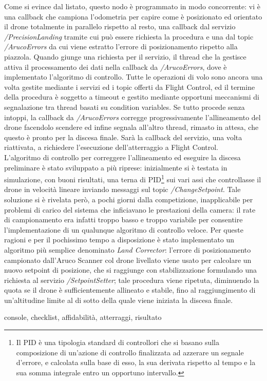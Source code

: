 Come si evince dal listato, questo nodo è programmato in modo concorrente: vi è una callback che campiona l'odometria per capire come è posizionato ed orientato il drone totalmente in parallelo rispetto al resto, una callback dal servizio \emph{/PrecisionLanding} tramite cui può essere richiesta la procedura e una dal topic \emph{/ArucoErrors} da cui viene estratto l'errore di posizionamento rispetto alla piazzola. Quando giunge una richiesta per il servizio, il thread che la gestisce attiva il processamento dei dati nella callback da \emph{/ArucoErrors}, dove è implementato l'algoritmo di controllo. Tutte le operazioni di volo sono ancora una volta gestite mediante i servizi ed i topic offerti da Flight Control, ed il termine della procedura è soggetto a timeout e gestito mediante opportuni meccanismi di segnalazione tra thread basati su condition variables. Se tutto procede senza intoppi, la callback da \emph{/ArucoErrors} corregge progressivamente l'allineamento del drone facendolo scendere ed infine segnala all'altro thread, rimasto in attesa, che questo è pronto per la discesa finale. Sarà la callback del servizio, una volta riattivata, a richiedere l'esecuzione dell'atterraggio a Flight Control.\\
L'algoritmo di controllo per correggere l'allineamento ed eseguire la discesa preliminare è stato sviluppato a più riprese: inizialmente si è testata in simulazione, con buoni risultati, una terna di PID\footnote{Il PID è una tipologia standard di controllori che si basano sulla composizione di un'azione di controllo finalizzata ad azzerare un segnale d'errore, e calcolata sulla base di esso, la sua derivata rispetto al tempo e la sua somma integrale entro un opportuno intervallo.} sui vari assi che controllasse il drone in velocità lineare inviando messaggi sul topic \emph{/ChangeSetpoint}. Tale soluzione si è rivelata però, a pochi giorni dalla competizione, inapplicabile per problemi di carico del sistema che inficiavano le prestazioni della camera: il rate di campionamento era infatti troppo basso e troppo variabile per consentire l'implementazione di un qualunque algoritmo di controllo veloce. Per queste ragioni e per il pochissimo tempo a disposizione è stato implementato un algoritmo più semplice denominato \emph{Land Corrector}: l'errore di posizionamento campionato dall'Aruco Scanner col drone livellato viene usato per calcolare un nuovo setpoint di posizione, che si raggiunge con stabilizzazione formulando una richiesta al servizio \emph{/SetpointSetter}; tale procedura viene ripetuta, diminuendo la quota se il drone è sufficientemente allineato e stabile, fino al raggiungimento di un'altitudine limite al di sotto della quale viene iniziata la discesa finale.

console, checklist, affidabilità, atterraggi, risultato
\indent
